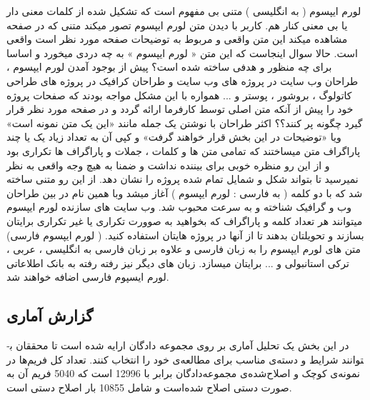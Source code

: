 لورم ایپسوم ( به انگلیسی  ) متنی بی مفهوم است که تشکیل شده از کلمات معنی دار یا بی معنی کنار هم. کاربر با دیدن متن لورم ایپسوم تصور میکند متنی که در صفحه مشاهده میکند این متن واقعی و مربوط به توضیحات صفحه مورد نظر است واقعی است. حالا سوال اینجاست که این متن « لورم ایپسوم » به چه دردی میخورد و اساسا برای چه منظور و هدفی ساخته شده است؟ پیش از بوجود آمدن لورم ایپسوم ، طراحان وب سایت در پروژه های وب سایت و طراحان کرافیک در پروژه های طراحی کاتولوگ ، بروشور ، پوستر و ... همواره با این مشکل مواجه بودند که صفحات پروژه خود را پیش از آنکه متن اصلی توسط کارفرما ارائه گردد و در صفحه مورد نظر قرار گیرد چگونه پر کنند؟؟ اکثر طراحان با نوشتن یک جمله مانند «این یک متن نمونه است» ویا «توضیحات در این بخش قرار خواهند گرفت» و کپی آن به تعداد زیاد یک یا چند پاراگراف متن میساختند که تمامی متن ها و کلمات ، جملات و پاراگراف ها تکراری بود و از این رو منظره خوبی برای بیننده نداشت و ضمنا به هیچ وجه واقعی به نظر نمیرسید تا بتواند شکل و شمایل تمام شده پروژه را نشان دهد. از این رو متنی ساخته شد که با دو کلمه ( به فارسی : لورم ایپسوم ) آغاز میشد وبا همین نام در بین طراحان وب و گرافیک شناخته و به سرعت محبوب شد. وب سایت های سازنده لورم ایپسوم میتوانند هر تعداد کلمه و پاراگراف که بخواهید به صوورت تکراری یا غیر تکراری برایتان بسازند و تحویلتان بدهند تا از آنها در پروژه هایتان استفاده کنید. ( لورم ایپسوم فارسی) متن های لورم ایپسوم را به زبان فارسی و علاوه بر زبان فارسی به انگلیسی ، عربی ، ترکی استانبولی و ... برایتان میسازد. زبان های دیگر نیز رفته رفته به بانک اطلاعاتی لورم ایسپوم فارسی اضافه خواهند شد.  

\subsection{گزارش آماری}

در این بخش یک تحلیل آماری بر روی مجموعه دادگان ارایه شده است تا محققان ب­توانند شرایط و دسته‌ی مناسب برای مطالعه‌­ی خود را انتخاب کنند. تعداد کل فریم‌ها در نمونه‌ی کوچک و اصلاح‌شده‌ی مجموعه‌دادگان برابر با 12996 است که 5040 فریم آن به صورت دستی اصلاح شده‌است و شامل 10855 بار اصلاح دستی است. 

